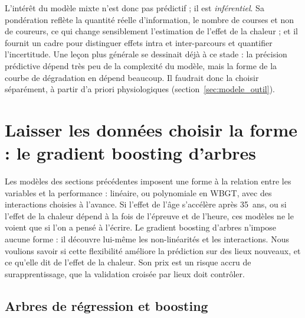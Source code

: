\documentclass[11pt,a4paper]{article}
\begin{document}
L'intérêt du modèle mixte n'est donc pas prédictif ; il est \emph{inférentiel}. Sa pondération reflète la quantité
réelle d'information, le nombre de courses et non de coureurs, ce qui change sensiblement l'estimation de l'effet de
la chaleur ; et il fournit un cadre pour distinguer effets intra et inter-parcours et quantifier l'incertitude. Une
leçon plus générale se dessinait déjà à ce stade : la précision prédictive dépend très peu de la complexité du
modèle, mais la forme de la courbe de dégradation en dépend beaucoup. Il faudrait donc la choisir séparément, à
partir d'a priori physiologiques (section~\ref{sec:modele_outil}).

\section{Laisser les données choisir la forme : le gradient boosting d'arbres}\label{sec:boosting}

Les modèles des sections précédentes imposent une forme à la relation entre les variables et la performance :
linéaire, ou polynomiale en WBGT, avec des interactions choisies à l'avance. Si l'effet de l'âge s'accélère après
35~ans, ou si l'effet de la chaleur dépend à la fois de l'épreuve et de l'heure, ces modèles ne le voient que si l'on
a pensé à l'écrire. Le gradient boosting d'arbres n'impose aucune forme : il découvre lui-même les non-linéarités et
les interactions. Nous voulions savoir si cette flexibilité améliore la prédiction sur des lieux nouveaux, et ce
qu'elle dit de l'effet de la chaleur. Son prix est un risque accru de surapprentissage, que la validation croisée par
lieux doit contrôler.

\subsection{Arbres de régression et boosting}\label{sec:arbres}
\end{document}
